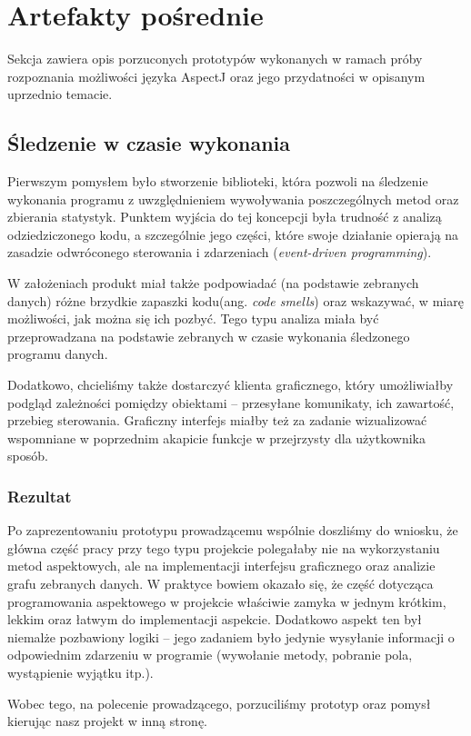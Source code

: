 \documentclass[12pt,a4paper,titlepage]{article}
\begin{document}
\section{Artefakty pośrednie}
 Sekcja zawiera opis porzuconych prototypów wykonanych w ramach próby rozpoznania możliwości języka AspectJ oraz jego przydatności w opisanym uprzednio temacie.
 \subsection{Śledzenie w czasie wykonania}
  Pierwszym pomysłem było stworzenie biblioteki, która pozwoli na śledzenie wykonania programu z uwzględnieniem wywoływania poszczególnych metod oraz zbierania statystyk. Punktem wyjścia do tej koncepcji była trudność z analizą odziedziczonego kodu, a szczególnie jego części, które swoje działanie opierają na zasadzie odwróconego sterowania i zdarzeniach (\emph{event-driven programming}).
  
  W założeniach produkt miał także podpowiadać (na podstawie zebranych danych) różne brzydkie zapaszki kodu(ang. \textit{code smells}) oraz wskazywać, w miarę możliwości, jak można się ich pozbyć. Tego typu analiza miała być przeprowadzana na podstawie zebranych w czasie wykonania śledzonego programu danych.
  
  Dodatkowo, chcieliśmy także dostarczyć klienta graficznego, który umożliwiałby podgląd zależności pomiędzy obiektami -- przesyłane komunikaty, ich zawartość, przebieg sterowania. Graficzny interfejs miałby też za zadanie wizualizować wspomniane w poprzednim akapicie funkcje w przejrzysty dla użytkownika sposób.
  \subsubsection*{Rezultat}
   Po zaprezentowaniu prototypu prowadzącemu wspólnie doszliśmy do wniosku, że główna część pracy przy tego typu projekcie polegałaby nie na wykorzystaniu metod aspektowych, ale na implementacji interfejsu graficznego oraz analizie grafu zebranych danych. W praktyce bowiem okazało się, że część dotycząca programowania aspektowego w projekcie właściwie zamyka w jednym krótkim, lekkim oraz łatwym do implementacji aspekcie. Dodatkowo aspekt ten był niemalże pozbawiony logiki -- jego zadaniem było jedynie wysyłanie informacji o odpowiednim zdarzeniu w programie (wywołanie metody, pobranie pola, wystąpienie wyjątku itp.). 
   
   Wobec tego, na polecenie prowadzącego, porzuciliśmy prototyp oraz pomysł kierując nasz projekt w inną stronę. 
   
\end{document}
